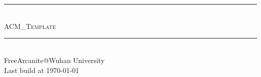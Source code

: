 \documentclass[12pt,a4paper, UTF8]{article}
\begin{document}
\begin{CJK}{UTF8}{gbsn}
    \pagestyle{fancy}
    \lhead{}
    \chead{}
    \cfoot{}
    \rfoot{\bfseries\thepage}
    \renewcommand{\headrulewidth}{0.4pt}
    \renewcommand{\footrulewidth}{0.4pt}

    \begin{titlepage}
	~
	\pagestyle{empty}
	
        \begin{center}
        ~\\[160pt]

        \hrule\ \\[8pt]
        \fontsize{48pt}{\baselineskip}\selectfont  \textsc{ACM\_Template}\\[8pt]
        \hrule\ \\[340pt]

        \huge FreeArcanite@Wuhan University\\[8pt]
        \Large Last build at \today
        \end{center}
    \end{titlepage}

    \restoregeometry

    \tableofcontents
    \clearpage

    
    \clearpage

    
    \clearpage

    
    \clearpage

    
    \clearpage

    
    \clearpage

    
    \clearpage

    
    \clearpage

\end{CJK}
\end{document}
